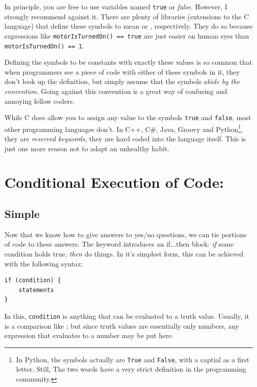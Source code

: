 \begin{warnbox}
In principle, you are free to use variables named \texttt{true} or \emph{false}. However, I strongly recommend against it. There are plenty of libraries (extensions to the C language) that define these symbols to mean  or , respectively. They do so because expressions like \texttt{motorIsTurnedOn() == true} are just easier on human eyes than \texttt{motorIsTurnedOn() == 1}.

Defining the symbols to be constants with exactly these values is so common that when programmers see a piece of code with either of these symbols in it, they don't look up the definition, but simply assume that the symbols \emph{abide by the convention}. Going against this convention is a great way of confusing and annoying fellow coders.

While C does allow you to assign any value to the symbols \texttt{true} and \texttt{false}, most other programming languages don't. In C++, C\#, Java, Groovy and Python\footnote{In Python, the symbols actually are \texttt{True} and \texttt{False}, with a captial as a first letter. Still, The two words have a very strict definition in the programming community.}, they are \emph{reserved keywords}, \ie they are hard coded into the language itself. This is just one more reason not to adapt an unhealthy habit.
\end{warnbox}

\section{Conditional Execution of Code: }
\subsection{Simple }
Now that we know how to give answers to yes/no questions, we can tie portions of code to these answers. The keyword  introduces an if...then block: \emph{if} some condition holds true, \emph{then} do things. In it's simplest form, this can be achieved with the following syntax:

\begin{codebox}
\begin{verbatim}
if (condition) {
    statements
}
\end{verbatim}
\end{codebox}

In this, \texttt{condition} is anything that can be evaluated to a truth value. Usually, it is a comparison like ; but since truth values are essentially only numbers, any expression that evaluates to a number may be put here.

